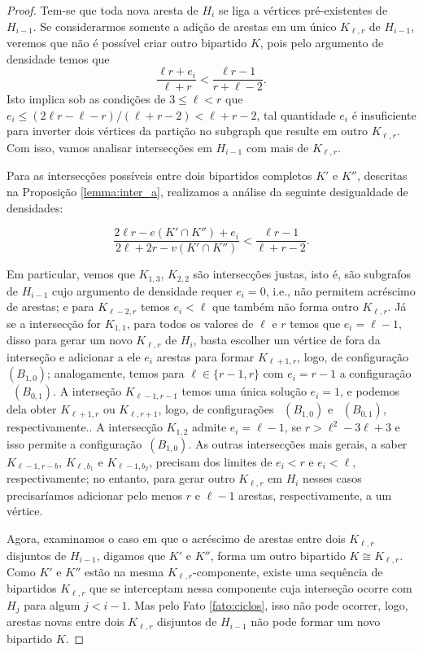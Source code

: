 \documentclass[11pt,twoside,a4paper]{book}
\newcommand{\K}{K_{\ell,r}} %
\theoremstyle{note}
\begin{document}
\begin{proof}
	 Tem-se que toda nova aresta de $H_i$ se liga a vértices pré-existentes de $H_{i-1}$. 
      Se considerarmos somente a adição de arestas em um único $\K$ de $H_{i-1}$, veremos que não é possível criar outro bipartido $K$, pois pelo argumento de densidade temos que
    \[ 
		\frac{\ell r + e_i}{\ell+r} < \frac{\ell r-1}{r+\ell-2}.
    \]
	Isto implica sob as condições de $3 \leq \ell < r$ que 
	$e_i \leq (2\ell r -\ell-r)/(\ell+r-2) < \ell+r-2$, 
	tal quantidade $e_i$ é insuficiente para inverter dois vértices da partição no subgraph que resulte em outro $\K$.
    Com isso, vamos analisar intersecções em $H_{i-1}$ com mais de $\K$.
    
    Para as intersecções possíveis entre dois bipartidos completos $K'$ e $K''$, descritas na Proposição \ref{lemma:inter_a}, realizamos a  análise da seguinte desigualdade de densidades:

    \[
		\frac{2\ell r - e(K'\cap K'') + e_i}{2\ell+2r - v(K' \cap K'')} < \frac{\ell r- 1}{\ell+r-2}.
    \]
    
     Em particular, vemos que $K_{1,3}$, $K_{2,2}$ são intersecções justas, isto é, são subgrafos de $H_{i-1}$ cujo argumento de densidade requer $e_i=0$, i.e., não permitem acréscimo de arestas;
    e para $K_{\ell-2,r}$ temos $e_i < \ell$ que também não forma outro $\K$.
     Já se a intersecção for $K_{1,1}$, para todos os valores de $\ell$ e $r$ temos que $e_i = \ell-1$, disso para gerar um novo $\K$ de $H_{i}$, basta escolher um vértice de fora da interseção e adicionar a ele $e_i$ arestas para formar $K_{\ell+1,r}$, logo, de configuração~\hyperref[configB]{$(B_{1,0})$}; analogamente, temos para $\ell \in
        \{r-1, r\}$ com $e_i = r-1$ a configuração
        ~\hyperref[configB]{$(B_{0,1})$}.
    A interseção $K_{\ell-1, r-1}$ temos uma única solução $e_i=1$, e podemos dela obter $K_{\ell+1, r}$ ou $K_{\ell,r+1}$, logo, de configurações ~\hyperref[configB]{$(B_{1,0})$}
    e ~\hyperref[configB]{$(B_{0,1})$}, respectivamente.. 
     A intersecção $K_{1,2}$ admite $e_i = \ell-1$, se $r > \ell^2 - 3\ell+3$ e isso permite a configuração~\hyperref[configB]{$(B_{1,0})$}.
    As outras intersecções mais gerais, a saber $K_{\ell-1, r-b}$, $K_{\ell,b_1}$ e $K_{\ell-1, b_2}$, precisam dos limites de $e_i < r$ e $e_i < \ell$, respectivamente; no entanto,
	para gerar outro $\K$ em $H_i$ nesses casos precisaríamos adicionar pelo menos
	$r$ e $\ell-1$ arestas, respectivamente, a um vértice. 
    
   Agora, examinamos o caso em que o acréscimo de arestas entre dois $\K$ disjuntos de $H_{i-1}$, digamos que $K'$ e $K''$, forma um outro bipartido $K\cong\K$.
    Como $K'$ e $K''$ estão na mesma $\K$-componente, existe uma sequência de bipartidos $\K$ que se interceptam nessa componente cuja interseção ocorre com $H_j$ para algum $j<i-1$.
    Mas pelo Fato \ref{fato:ciclos}, isso não pode ocorrer, logo, arestas novas entre dois $\K$ disjuntos de $H_{i-1}$ não pode formar um novo bipartido $K$.

\end{proof}
  
\end{document}

